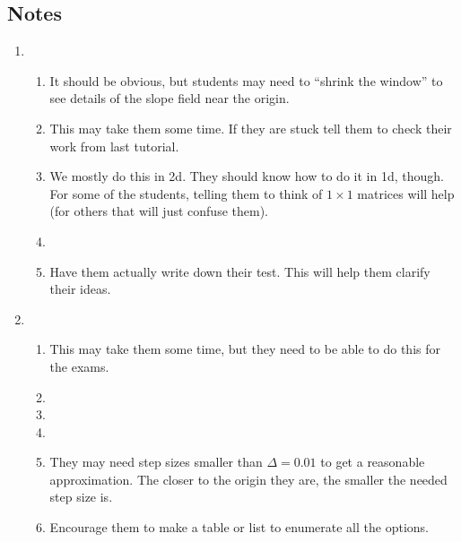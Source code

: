 \subsection*{Notes}
\begin{enumerate}
	\item 
	\begin{enumerate}
		\item It should be obvious, but students may need to ``shrink the window'' to see details of
		the slope field near the origin.
		\item This may take them some time. If they are stuck tell them to check their work from last tutorial.
		\item We mostly do this in 2d. They should know how to do it in 1d, though. For some of the students,
		telling them to think of $1\times 1$ matrices will help (for others that will just confuse them).
		\item 
		\item Have them actually write down their test. This will help them clarify their ideas.
	\end{enumerate}
	\item
	\begin{enumerate}
		\item This may take them some time, but they need to be able to do this for the exams.
		\item
		\item 
		\item 
		\item They may need step sizes smaller than $\Delta=0.01$ to get a reasonable approximation.
		The closer to the origin they are, the smaller the needed step size is.
		\item Encourage them to make a table or list to enumerate all the options.
	\end{enumerate}
\end{enumerate}